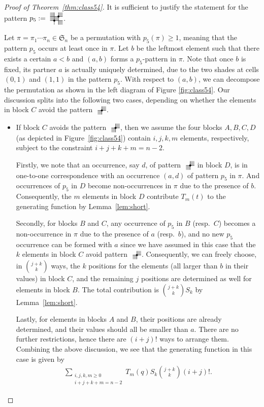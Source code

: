 \documentclass[12pt]{article}
\def\fS{\mathfrak{S}}
\newcommand{\pattern}[4]{										
	\raisebox{0.6ex}{
		\begin{tikzpicture}[scale=0.35, baseline=(current bounding box.center), #1]
		\foreach \x/\y in {#4}		\fill[gray!50] (\x,\y) rectangle +(1,1);

		\draw (0.01,0.01) grid (#2+0.99,#2+0.99);
		\foreach \x/\y in {#3}		\filldraw (\x,\y) circle (6pt);
		\end{tikzpicture}}
}
\begin{document}
\begin{proof}[Proof of Theorem~\ref{thm:class54}]
It is sufficient to justify the statement for the pattern $p_5:=\pattern{scale=0.6}{2}{1/1,2/2}{0/2,2/2,0/1,1/1,2/0}$. 




Let $\pi=\pi_1\cdots \pi_n\in \fS_n$ be a permutation with $p_5(\pi)\geq 1$, meaning that the pattern $p_5$ occurs at least once in $\pi$. Let $b$ be the leftmost element such that there exists a certain $a<b$ and $(a,b)$ forms a $p_5$-pattern in $\pi$. Note that once $b$ is fixed, its partner $a$ is actually uniquely determined, due to the two shades at cells $(0,1)$ and $(1,1)$ in the pattern $p_5$. With respect to $(a,b)$, we can decompose the permutation as shown in the left diagram of Figure \ref{fig:class54}. Our discussion splits into the following two cases, depending on whether the elements in block $C$ avoid the pattern $\pattern{scale=0.6}{1}{1/1}{0/0,1/1}$.
\begin{itemize}
\item If block $C$ avoids the pattern $\pattern{scale=0.6}{1}{1/1}{0/0,1/1}$, then we assume the four blocks $A,B,C,D$ (as depicted in Figure~\ref{fig:class54}) contain $i,j,k,m$ elements, respectively, subject to the constraint $i+j+k+m=n-2$. 

Firstly, we note that an occurrence, say $d$, of pattern $\pattern{scale=0.6}{1}{1/1}{0/0,1/1}$ in block $D$, is in one-to-one correspondence with an occurrence $(a,d)$ of pattern $p_5$ in $\pi$. And occurrences of $p_5$ in $D$ become non-occurrences in $\pi$ due to the presence of $b$. Consequently, the $m$ elements in block $D$ contribute $T_m(t)$ to the generating function by Lemma~\ref{lem:short}. 

Secondly, for blocks $B$ and $C$, any occurrence of $p_5$ in $B$ (resp.~$C$) becomes a non-occurrence in $\pi$ due to the presence of $a$ (resp.~$b$), and no new $p_5$ occurrence can be formed with $a$ since we have assumed in this case that the $k$ elements in block $C$ avoid pattern $\pattern{scale=0.6}{1}{1/1}{0/0,1/1}$. Consequently, we can freely choose, in $\binom{j+k}{k}$ ways, the $k$ positions for the elements (all larger than $b$ in their values) in block $C$, and the remaining $j$ positions are determined as well for elements in block $B$. The total contribution is $\binom{j+k}{k}S_k$ by Lemma~\ref{lem:short}.

Lastly, for elements in blocks $A$ and $B$, their positions are already determined, and their values should all be smaller than $a$. There are no further restrictions, hence there are $(i+j)!$ ways to arrange them. Combining the above discussion, we see that the generating function in this case is given by 
\begin{align}\label{eq:C1}
\sum_{\substack{i, j, k, m\geq 0\\ i+j+k+m=n-2}}T_m(q) S_k \binom{j+k}{k}(i+j)!.
\end{align}


\end{itemize}
\end{proof}
\end{document}
